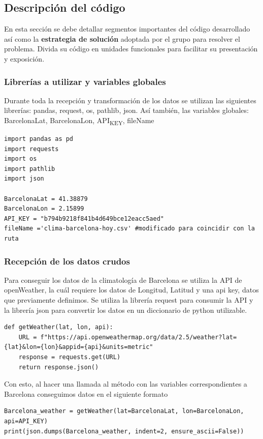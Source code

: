 \documentclass[11pt]{article}
\begin{document}
\subsection{Descripción del código}
\label{sec:org396ea5c}
En esta sección se debe detallar segmentos importantes del código
desarrollado así como la \textbf{\textbf{estrategia de solución}} adoptada por el
grupo para resolver el problema. Divida su código en unidades
funcionales para facilitar su presentación y exposición.
\subsubsection{Librerías a utilizar y variables globales}
\label{sec:orgad3823a}
Durante toda la recepción y transformación de los datos se utilizan
las siguientes librerías: pandas, request, os, pathlib, json. Así también, las variables globales: BarcelonaLat, BarcelonaLon,
API\textsubscript{KEY}, fileName 
\begin{verbatim}
import pandas as pd
import requests
import os
import pathlib
import json

BarcelonaLat = 41.38879
BarcelonaLon = 2.15899
API_KEY = "b794b9218f841b4d649bce12eacc5aed"
fileName ='clima-barcelona-hoy.csv' #modificado para coincidir con la ruta
\end{verbatim}
\subsubsection{Recepción de los datos crudos}
\label{sec:orgbd42699}
Para conseguir los datos de la climatología de Barcelona se utiliza la
API de openWeather, la cuál requiere los datos de Longitud, Latitud y
una api key, datos que previamente definimos. Se utiliza la librería
request  para consumir la API y la librería json para convertir los
datos en un diccionario de python utilizable.
\begin{verbatim}
def getWeather(lat, lon, api):
    URL = f"https://api.openweathermap.org/data/2.5/weather?lat={lat}&lon={lon}&appid={api}&units=metric"
    response = requests.get(URL)
    return response.json()
\end{verbatim}
Con esto, al hacer una llamada al método con las variables
correspondientes a Barcelona conseguimos datos en el siguiente formato
\begin{verbatim}
Barcelona_weather = getWeather(lat=BarcelonaLat, lon=BarcelonaLon, api=API_KEY)
print(json.dumps(Barcelona_weather, indent=2, ensure_ascii=False))
\end{verbatim}
\end{document}
